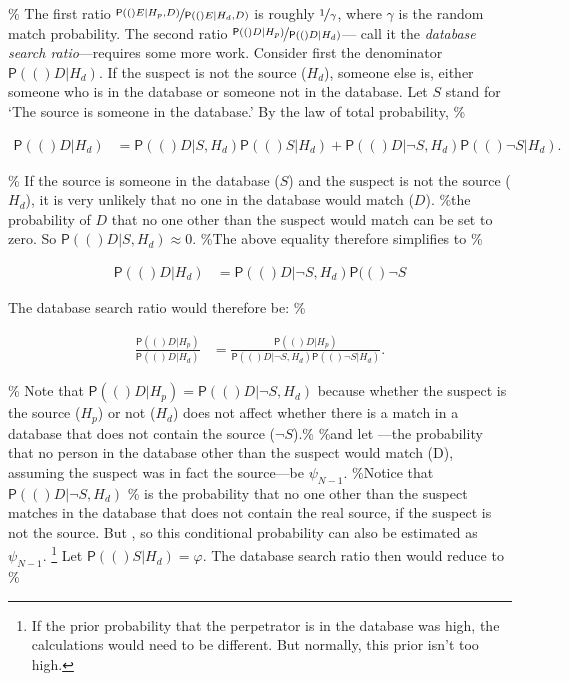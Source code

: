 \documentclass[10pt,dvipsnames,enabledeprecatedfontcommands]{scrartcl}
\newcommand{\pr}[1]{\mathsf{P}(#1)}
\begin{document}
\% The first ratio \(\nicefrac{\pr(E\vert H_p,D)}{\pr(E\vert H_d,D)}\)
is roughly \(\nicefrac{1}{\gamma}\), where \(\gamma\) is the random
match probability. The second ratio
\(\nicefrac{\pr(D\vert H_p)}{\pr(D\vert H_d)}\)--- call it the
\emph{database search ratio}---requires some more work. Consider first
the denominator \(\pr(D \vert H_d)\). If the suspect is not the source
(\(H_d\)), someone else is, either someone who is in the database or
someone not in the database. Let \(S\) stand for `The source is someone
in the database.' By the law of total probability, \%

\begin{align*}
\pr(D\vert H_d) & = \pr(D\vert S, H_d) \pr(S\vert H_d) + \pr(D\vert \neg S, H_d) \pr(\neg S \vert H_d). 
\end{align*}

\% If the source is someone in the database (\(S\)) and the suspect is
not the source (\(H_d\)), it is very unlikely that no one in the
database would match (\(D\)). \%the probability of \(D\) that no one
other than the suspect would match can be set to zero. So
\(\pr(D\vert S, H_d)\approx 0\). \%The above equality therefore
simplifies to \%

\begin{align*}
\pr(D\vert H_d) & =  \pr(D\vert \neg S, H_d) \pr(\neg S %
\end{align*}

The database search ratio would therefore be: \%

\begin{align*}
\frac{\pr(D\vert H_p)}{\pr(D\vert H_d)} & = \frac{\pr(D\vert H_p)}{\pr(D\vert \neg S, H_d) \pr(\neg S \vert H_d)}.
\end{align*}

\% Note that \(\pr(D\vert H_p)=\pr(D\vert \neg S, H_d)\) because whether
the suspect is the source (\(H_p\)) or not (\(H_d\)) does not affect
whether there is a match in a database that does not contain the source
(\(\neg S\)).\% \%and let ---the probability that no person in the
database other than the suspect would match (D), assuming the suspect
was in fact the source---be \(\psi_{N-1}\). \%Notice that
\(\pr(D\vert \neg S, H_d)\) \% is the probability that no one other than
the suspect matches in the database that does not contain the real
source, if the suspect is not the source. But , so this conditional
probability can also be estimated as \(\psi_{N-1}\).
\footnote{If the prior probability that the perpetrator is in the database was high, the calculations would need to be different. But normally, this prior isn't too high.}
Let \(\pr(S | H_d)=\varphi\). The database search ratio then would
reduce to \%
\end{document}

